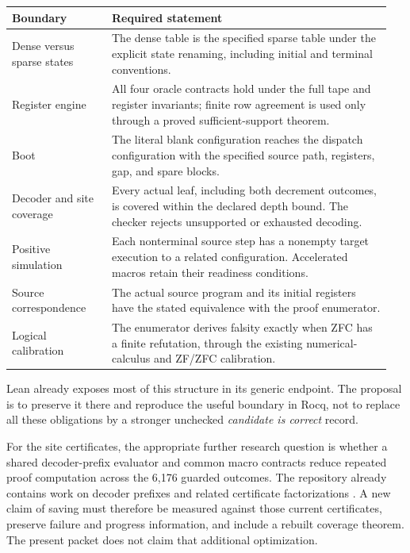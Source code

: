 \documentclass[11pt,a4paper]{article}
\theoremstyle{remark}
\begin{document}
\begin{longtable}{@{}p{0.25\linewidth}p{0.70\linewidth}@{}}
\toprule
Boundary & Required statement\\
\midrule
\endhead
Dense versus sparse states &
The dense table is the specified sparse table under the explicit state
renaming, including initial and terminal conventions.\\
\addlinespace
Register engine &
All four oracle contracts hold under the full tape and register invariants;
finite row agreement is used only through a proved sufficient-support theorem.\\
\addlinespace
Boot &
The literal blank configuration reaches the dispatch configuration with
the specified source path, registers, gap, and spare blocks.\\
\addlinespace
Decoder and site coverage &
Every actual leaf, including both decrement outcomes, is covered within the
declared depth bound. The checker rejects unsupported or exhausted decoding.\\
\addlinespace
Positive simulation &
Each nonterminal source step has a nonempty target execution to a related
configuration. Accelerated macros retain their readiness conditions.\\
\addlinespace
Source correspondence &
The actual source program and its initial registers have the stated
equivalence with the proof enumerator.\\
\addlinespace
Logical calibration &
The enumerator derives falsity exactly when ZFC has a finite refutation,
through the existing numerical-calculus and ZF/ZFC calibration.\\
\bottomrule
\end{longtable}
Lean already exposes most of this structure in its generic endpoint.
The proposal is to preserve it there and reproduce the useful boundary in
Rocq, not to replace all these obligations by a stronger unchecked
\emph{candidate is correct} record.

For the site certificates, the appropriate further research question is
whether a shared decoder-prefix evaluator and common macro contracts reduce
repeated proof computation across the 6,176 guarded outcomes.
The repository already contains work on decoder prefixes and related
certificate factorizations \cite{history}. A new claim of saving must
therefore be measured against those current certificates, preserve failure
and progress information, and include a rebuilt coverage theorem. The
present packet does not claim that additional optimization.
\end{document}

